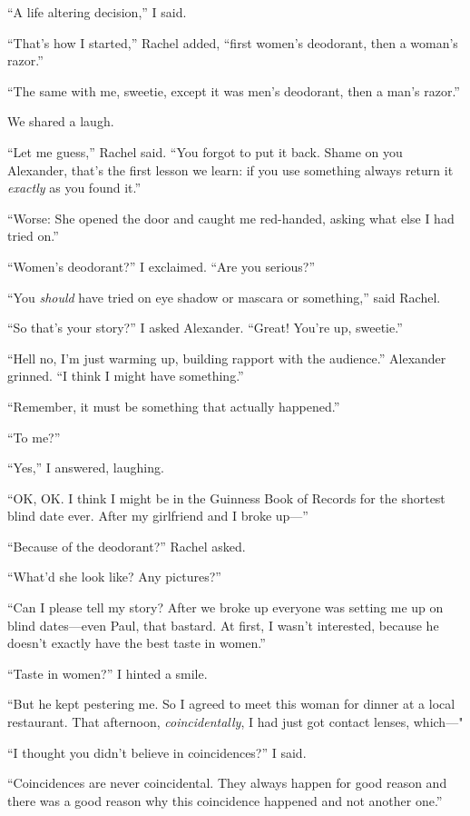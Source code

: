 ``A life altering decision,'' I said.

``That's how I started,'' Rachel added, ``first women's deodorant, then
a woman's razor.''

``The same with me, sweetie, except it was men's deodorant, then a man's
razor.''

We shared a laugh.

``Let me guess,'' Rachel said. ``You forgot to put it back. Shame on you
Alexander, that's the first lesson we learn: if you use something always
return it \emph{exactly} as you found it.''

``Worse: She opened the door and caught me red-handed, asking what else
I had tried on.''

``Women's deodorant?'' I exclaimed. ``Are you serious?''

``You \emph{should} have tried on eye shadow or mascara or something,''
said Rachel.

``So that's your story?'' I asked Alexander. ``Great! You're up,
sweetie.''

``Hell no, I'm just warming up, building rapport with the audience.''
Alexander grinned. ``I think I might have something.''

``Remember, it must be something that actually happened.''

``To me?''

``Yes,'' I answered, laughing.

``OK, OK. I think I might be in the Guinness Book of Records for the
shortest blind date ever. After my girlfriend and I broke up---''

``Because of the deodorant?'' Rachel asked.

``What'd she look like? Any pictures?''

``Can I please tell my story? After we broke up everyone was setting me
up on blind dates---even Paul, that bastard. At first, I wasn't
interested, because he doesn't exactly have the best taste in women.''

``Taste in women?'' I hinted a smile.

``But he kept pestering me. So I agreed to meet this woman for dinner at
a local restaurant. That afternoon, \emph{coincidentally}, I had just
got contact lenses, which---"

``I thought you didn't believe in coincidences?'' I said.

``Coincidences are never coincidental. They always happen for good
reason and there was a good reason why this coincidence happened and not
another one.''

